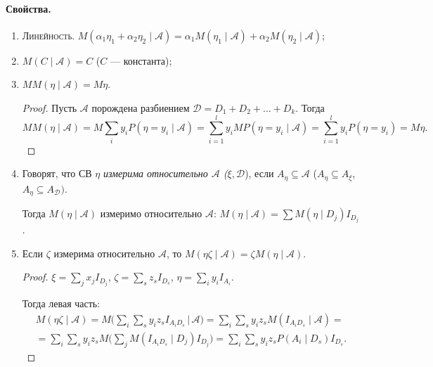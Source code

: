 \paragraph{Свойства.}
\begin{enumerate}
  \item \textsc{Линейность}. $M(\alpha_1 \eta_1 + \alpha_2 \eta_2 \mid \mathscr{A}) =
      \alpha_1 M(\eta_1 \mid \mathscr{A}) + \alpha_2 M(\eta_2 \mid \mathscr{A})$;
  \item $M(C \mid \mathscr{A}) = C$ ($ C $ --- константа);
  \item $MM(\eta\mid  \mathscr{A}) = M\eta$.
    \begin{proof}
      Пусть $\mathscr{A}$ порождена разбиением $\mathscr{D} = D_1 + D_2 + \dots
      + D_k$. Тогда
      \[
        MM(\eta \mid  \mathscr{A}) = M \sum_i y_i P(\eta = y_i \mid
        \mathscr{A}) = \sum_{i=1}^l y_i MP(\eta = y_i \mid \mathscr{A}) =
        \sum_{i=1}^l y_i P(\eta=y_i) = M\eta.
      \]
    \end{proof}

  \item \begin{definition}
      Говорят, что СВ $\eta$ \emph{измерима относительно $\mathscr{A}$ ($
      \xi, \mathscr{D}$}), если
      $A_{\eta} \subseteq \mathscr{A}$ ($A_\eta \subseteq A_\xi$, $ A_\eta
      \subseteq A_{\mathscr D}) $.
    \end{definition}

    Тогда $M(\eta \mid  \mathscr{A})$ измеримо относительно $\mathscr{A}$:
      $M(\eta \mid  \mathscr{A}) = \sum M(\eta \mid  D_j) I_{D_j}$.

    \item Если $\zeta$ измерима относительно $\mathscr{A}$, то $M(\eta \zeta
      \mid  \mathscr{A}) = \zeta M(\eta \mid  \mathscr{A})$.
    \begin{proof}
      $\xi = \sum_j x_j I_{D_j}$, $\zeta = \sum_s z_s I_{D_s}$, $\eta = \sum_i y_i I_{A_i}$.

      Тогда левая часть:
      \begin{multline*}
        M(\eta\zeta \mid  \mathscr{A}) = M \bigg( \sum_i \sum_s y_i z_s I_{A_i
        D_s} \, \Big| \,  \mathscr{A} \bigg)
        = \sum_i \sum_s y_i z_s M ( I_{A_i D_s} \mid  \mathscr{A} ) = \\
        = \sum_i \sum_s y_i z_s M \bigg( \sum_j M(I_{A_i D_s} \mid  D_j) I_{D_j}
          \bigg) 
        = \sum_i \sum_s y_i z_s P(A_i \mid  D_s) I_{D_s}.
      \end{multline*}


\end{proof}
\end{enumerate}
